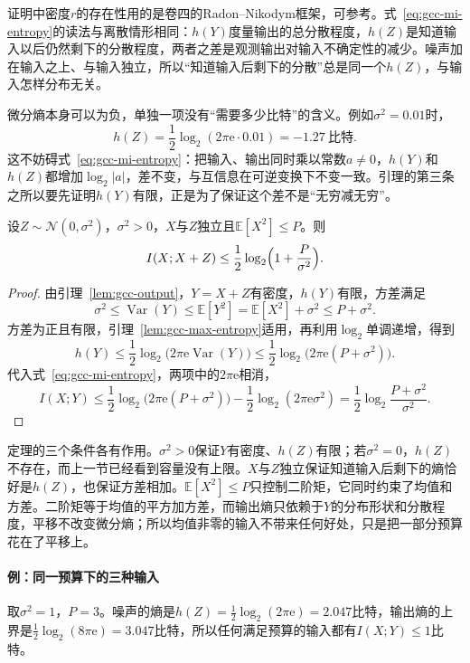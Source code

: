 证明中密度$r$的存在性用的是卷四的Radon–Nikodym框架，可参考。式~\eqref{eq:gcc-mi-entropy}的读法与离散情形相同：$h(Y)$度量输出的总分散程度，$h(Z)$是知道输入以后仍然剩下的分散程度，两者之差是观测输出对输入不确定性的减少。噪声加在输入之上、与输入独立，所以“知道输入后剩下的分散”总是同一个$h(Z)$，与输入怎样分布无关。

微分熵本身可以为负，单独一项没有“需要多少比特”的含义。例如$\sigma^2=0.01$时，
\[
 h(Z)=\frac12\log_2(2\pi\mathrm{e}\cdot0.01)=-1.27\ \text{比特}.
\]
这不妨碍式~\eqref{eq:gcc-mi-entropy}：把输入、输出同时乘以常数$a\neq0$，$h(Y)$和$h(Z)$都增加$\log_2\lvert a\rvert$，差不变，与互信息在可逆变换下不变一致。引理的第三条之所以要先证明$h(Y)$有限，正是为了保证这个差不是“无穷减无穷”。

\begin{theorem}[互信息的上界]
\label{thm:gcc-upper}
设$Z\sim\mathcal{N}(0,\sigma^2)$，$\sigma^2>0$，$X$与$Z$独立且$\mathbb{E}[X^2]\leq P$。则
\begin{equation}
 I(X;X+Z)\leq\frac12\log_2\Bigl(1+\frac{P}{\sigma^2}\Bigr) .
 \label{eq:gcc-upper}
\end{equation}
\end{theorem}

\begin{proof}
由引理~\ref{lem:gcc-output}，$Y=X+Z$有密度，$h(Y)$有限，方差满足
\[
 \sigma^2\leq\operatorname{Var}(Y)\leq\mathbb{E}[Y^2]=\mathbb{E}[X^2]+\sigma^2\leq P+\sigma^2 .
\]
方差为正且有限，引理~\ref{lem:gcc-max-entropy}适用，再利用$\log_2$单调递增，得到
\[
 h(Y)\leq\frac12\log_2\bigl(2\pi\mathrm{e}\operatorname{Var}(Y)\bigr)\leq\frac12\log_2\bigl(2\pi\mathrm{e}(P+\sigma^2)\bigr) .
\]
代入式~\eqref{eq:gcc-mi-entropy}，两项中的$2\pi\mathrm{e}$相消，
\[
 I(X;Y)\leq\frac12\log_2\bigl(2\pi\mathrm{e}(P+\sigma^2)\bigr)-\frac12\log_2(2\pi\mathrm{e}\sigma^2)=\frac12\log_2\frac{P+\sigma^2}{\sigma^2} .
\]
\end{proof}

定理的三个条件各有作用。$\sigma^2>0$保证$Y$有密度、$h(Z)$有限；若$\sigma^2=0$，$h(Z)$不存在，而上一节已经看到容量没有上限。$X$与$Z$独立保证知道输入后剩下的熵恰好是$h(Z)$，也保证方差相加。$\mathbb{E}[X^2]\leq P$只控制二阶矩，它同时约束了均值和方差。二阶矩等于均值的平方加方差，而输出熵只依赖于$Y$的分布形状和分散程度，平移不改变微分熵；所以均值非零的输入不带来任何好处，只是把一部分预算花在了平移上。

\paragraph{例：同一预算下的三种输入}
取$\sigma^2=1$，$P=3$。噪声的熵是$h(Z)=\frac12\log_2(2\pi\mathrm{e})=2.047$比特，输出熵的上界是$\frac12\log_2(8\pi\mathrm{e})=3.047$比特，所以任何满足预算的输入都有$I(X;Y)\leq1$比特。

